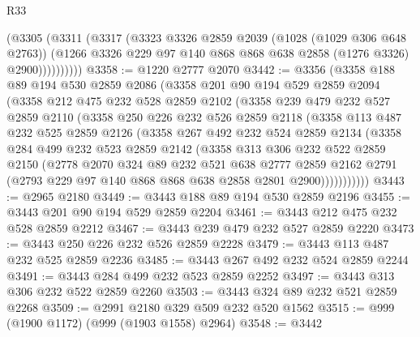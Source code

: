 \begin{lexlean}{R33}
\begin{coremodule}
              (@3305
                (@3311
                  (@3317
                    (@3323
                      @3326
                      @2859
                      @2039
                      (@1028 (@1029 @306 @648 @2763))
                      (@1266 @3326 @229 @97 @140 @868 @868 @638 @2858 (@1276 @3326) @2900))))))))))
@3358 := @1220 @2777 @2070
@3442 := @3356
    (@3358
      @188
      @89
      @194
      @530
      @2859
      @2086
      (@3358
        @201
        @90
        @194
        @529
        @2859
        @2094
        (@3358
          @212
          @475
          @232
          @528
          @2859
          @2102
          (@3358
            @239
            @479
            @232
            @527
            @2859
            @2110
            (@3358
              @250
              @226
              @232
              @526
              @2859
              @2118
              (@3358
                @113
                @487
                @232
                @525
                @2859
                @2126
                (@3358
                  @267
                  @492
                  @232
                  @524
                  @2859
                  @2134
                  (@3358
                    @284
                    @499
                    @232
                    @523
                    @2859
                    @2142
                    (@3358
                      @313
                      @306
                      @232
                      @522
                      @2859
                      @2150
                      (@2778
                        @2070
                        @324
                        @89
                        @232
                        @521
                        @638
                        @2777
                        @2859
                        @2162
                        @2791
                        (@2793 @229 @97 @140 @868 @868 @638 @2858 @2801 @2900)))))))))))
@3443 := @2965 @2180
@3449 := @3443 @188 @89 @194 @530 @2859 @2196
@3455 := @3443 @201 @90 @194 @529 @2859 @2204
@3461 := @3443 @212 @475 @232 @528 @2859 @2212
@3467 := @3443 @239 @479 @232 @527 @2859 @2220
@3473 := @3443 @250 @226 @232 @526 @2859 @2228
@3479 := @3443 @113 @487 @232 @525 @2859 @2236
@3485 := @3443 @267 @492 @232 @524 @2859 @2244
@3491 := @3443 @284 @499 @232 @523 @2859 @2252
@3497 := @3443 @313 @306 @232 @522 @2859 @2260
@3503 := @3443 @324 @89 @232 @521 @2859 @2268
@3509 := @2991 @2180 @329 @509 @232 @520 @1562
@3515 := @999 (@1900 @1172) (@999 (@1903 @1558) @2964)
@3548 := @3442

\end{coremodule}
\end{lexlean}
